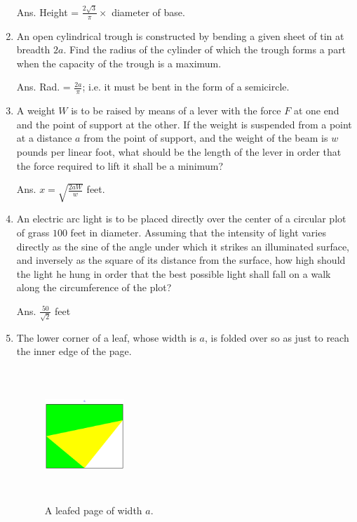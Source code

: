 \begin{enumerate}
Ans. Height = $\frac{2 \sqrt{3}}{\pi} \times$ diameter of base.

\item
An open cylindrical trough is constructed by bending a given sheet of 
tin at breadth $2a$. Find the radius of the cylinder of which the 
trough forms a part when the capacity of the trough is a maximum.

Ans. Rad. = $\frac{2a}{\pi}$; i.e. it must be bent in the form of a semicircle.

\item
A weight $W$ is to be raised by means of a lever with the force $F$ 
at one end and the point of support at the other. If the weight is 
suspended from a point at a distance $a$ from the point of support, 
and the weight of the beam is $w$ pounds per linear foot, what 
should be the length of the lever in order that the force required 
to lift it shall be a minimum?

Ans. $x = \sqrt{\frac{2aW}{w}}$ feet.

\item
An electric arc light is to be placed directly over the center of a 
circular plot of grass $100$ feet in diameter. Assuming that the 
intensity of light varies directly as the sine of the angle under 
which it strikes an illuminated surface, and inversely as the square 
of its distance from the surface, how high should the light he 
hung in order that the best possible light shall fall on a walk along 
the circumference of the plot?

Ans. $\frac{50}{\sqrt{2}}$ feet

\item
The lower corner of a leaf, whose width is $a$, is folded over so as just 
to reach the inner edge of the page. 

\begin{figure}[h!]
\begin{minipage}{\textwidth}
\begin{center}
\includegraphics[height=5cm,width=3cm]{leaf2.eps}
\end{center}
\end{minipage}
\caption{A leafed page of width $a$.}
\label{fig:leaf}
\end{figure}


\end{enumerate}
